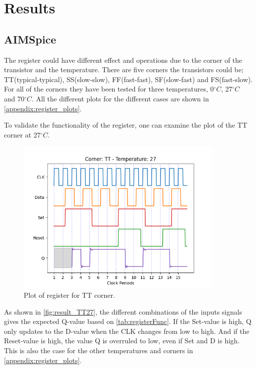 \section{Results}
\label{sec:results}

\subsection{AIMSpice}

The register could have different effect and operations due to the corner of the transistor and the temperature. There are five corners the transistors could be; TT(typical-typical), SS(slow-slow), FF(fast-fast), SF(slow-fast) and FS(fast-slow).  For all of the corners they have been tested for three temperatures, 0$^\circ C$, 27$^\circ C$ and 70$^\circ C$. All the different plots for the different cases are shown in \autoref{appendix:register_plots}. 

To validate the functionality of the register, one can examine the plot of the TT corner at 27$^\circ C$. 

\begin{figure}[H]
    \centering
    \includegraphics[width=0.9\textwidth]{Figures/Aimspice_Plots/TT_27.png}
    \caption{Plot of register for TT corner.}
    \label{fig:result_TT27}
\end{figure}

As shown in \autoref{fig:result_TT27}, the different combinations of the inputs signals gives the expected Q-value based on \autoref{tab:registerFunc}. If the Set-value is high, Q only updates to the D-value when the CLK changes from low to high. And if the Reset-value is high, the value Q is overruled to low, even if Set and D is high. This is also the case for the other temperatures and corners in \autoref{appendix:register_plots}.

